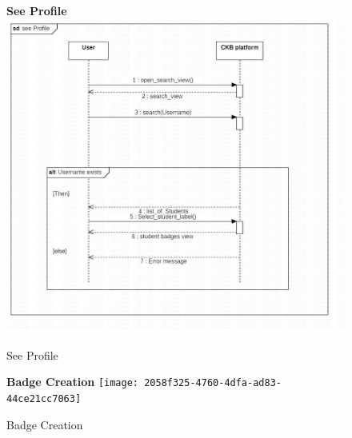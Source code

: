 \begin{enumerate}[label=\textbf{[UC\arabic*]}]
    \begin{figure}
    \item \textbf{See Profile}
        \centering
        \includegraphics[width= \textwidth]{Images/WhatsApp Image 2023-12-20 at 18.34.43_e728ecf8.jpg}
        \caption{See Profile}
        \label{fig:enter-label}
    \end{figure}

    \begin{figure}
    \item \textbf{Badge Creation}
        \centering
        \texttt{[image: 2058f325-4760-4dfa-ad83-44ce21cc7063]}
        \caption{Badge Creation}
        \label{fig:enter-label}
    \end{figure}

    

    
    
\end{enumerate}








\pagebreak[4]
\newpage


